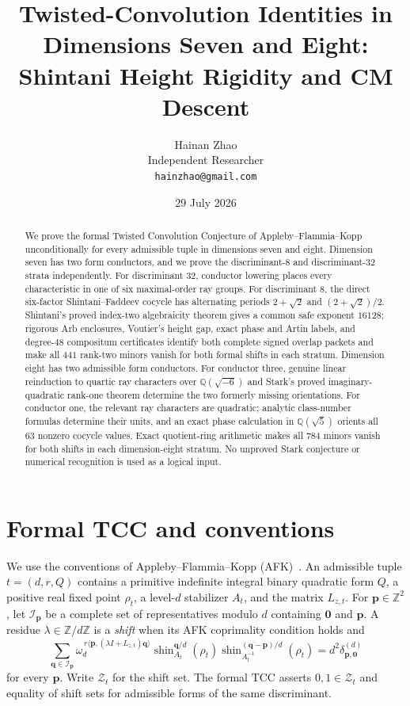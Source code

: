 \documentclass[11pt]{article}
\title{Twisted-Convolution Identities in Dimensions Seven and Eight:\\
Shintani Height Rigidity and CM Descent}
\author{Hainan Zhao\\
\small Independent Researcher\\
\small\texttt{hainzhao@gmail.com}}
\date{29 July 2026}
\newcommand{\Q}{\mathbb Q}
\newcommand{\Z}{\mathbb Z}
\begin{document}
\maketitle

\begin{abstract}
We prove the formal Twisted Convolution Conjecture of
Appleby--Flammia--Kopp unconditionally for every admissible tuple in
dimensions seven and eight.  Dimension seven has two form conductors,
and we prove the discriminant-$8$ and discriminant-$32$ strata
independently.  For discriminant $32$, conductor lowering places every
characteristic in one of six maximal-order ray groups.  For
discriminant $8$, the direct six-factor Shintani--Faddeev cocycle has
alternating periods $2+\sqrt2$ and $(2+\sqrt2)/2$.  Shintani's proved
index-two algebraicity theorem gives a common safe exponent $16128$;
rigorous Arb enclosures, Voutier's height gap, exact phase and Artin
labels, and degree-$48$ compositum certificates identify both complete
signed overlap packets and make all $441$ rank-two minors vanish for
both formal shifts in each stratum.  Dimension eight has two
admissible form conductors.
For conductor three, genuine linear reinduction to quartic ray
characters over $\Q(\sqrt{-6})$ and Stark's proved
imaginary-quadratic rank-one theorem determine the two formerly
missing orientations.  For conductor one, the relevant ray characters
are quadratic; analytic class-number formulas determine their units,
and an exact phase calculation in $\Q(\sqrt5)$ orients all $63$
nonzero cocycle values.  Exact quotient-ring arithmetic makes all
$784$ minors vanish for both shifts in each dimension-eight stratum.
No unproved Stark conjecture or numerical recognition is used as a
logical input.
\end{abstract}

\section{Formal TCC and conventions}

We use the conventions of Appleby--Flammia--Kopp (AFK)~\cite{AFK}.
An admissible tuple $t=(d,r,Q)$ contains a primitive indefinite
integral binary quadratic form $Q$, a positive real fixed point
$\rho_t$, a level-$d$ stabilizer $A_t$, and the matrix $L_{z,t}$.
For $\boldsymbol p\in\Z^2$, let $\mathcal I_{\boldsymbol p}$ be a
complete set of representatives modulo $d$ containing
$\boldsymbol0$ and $\boldsymbol p$.  A residue
$\lambda\in\Z/d\Z$ is a \emph{shift} when its AFK coprimality
condition holds and
\[
 \sum_{\boldsymbol q\in\mathcal I_{\boldsymbol p}}
 \omega_d^{\,r\langle\boldsymbol p,
  (\lambda I+L_{z,t})\boldsymbol q\rangle}
 \operatorname{shin}_{A_t}^{\boldsymbol q/d}(\rho_t)
 \operatorname{shin}_{A_t^{-1}}^{
       (\boldsymbol q-\boldsymbol p)/d}(\rho_t)
 =d^2\delta_{\boldsymbol p,\boldsymbol0}^{(d)}
\tag{TCC}
\]
for every $\boldsymbol p$.  Write $\mathcal Z_t$ for the shift set.
The formal TCC asserts $0,1\in\mathcal Z_t$ and equality of shift
sets for admissible forms of the same discriminant.
\end{document}
